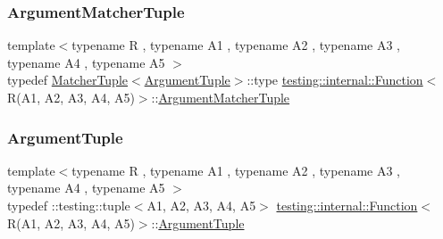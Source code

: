 \mbox{\label{structtesting_1_1internal_1_1Function_3_01R_07A1_00_01A2_00_01A3_00_01A4_00_01A5_08_4_a03c18380538e53141227afe6d0f20cc8}} 
\subsubsection{\texorpdfstring{ArgumentMatcherTuple}{ArgumentMatcherTuple}}
{\footnotesize\ttfamily template$<$typename R , typename A1 , typename A2 , typename A3 , typename A4 , typename A5 $>$ \\
typedef \mbox{\hyperlink{structtesting_1_1internal_1_1MatcherTuple}{Matcher\+Tuple}}$<$\mbox{\hyperlink{structtesting_1_1internal_1_1Function_3_01R_07_08_4_ad483c3128c470d8cdb55c3ac1c575c11}{Argument\+Tuple}}$>$\+::type \mbox{\hyperlink{structtesting_1_1internal_1_1Function}{testing\+::internal\+::\+Function}}$<$ R(A1, A2, A3, A4, A5)$>$\+::\mbox{\hyperlink{structtesting_1_1internal_1_1Function_3_01R_07_08_4_a9bec5cf8937e8af99dedab2f40129fab}{Argument\+Matcher\+Tuple}}}

\mbox{\label{structtesting_1_1internal_1_1Function_3_01R_07A1_00_01A2_00_01A3_00_01A4_00_01A5_08_4_af5a1487829347eae2a48b2f66f216f52}} 
\subsubsection{\texorpdfstring{ArgumentTuple}{ArgumentTuple}}
{\footnotesize\ttfamily template$<$typename R , typename A1 , typename A2 , typename A3 , typename A4 , typename A5 $>$ \\
typedef \+::testing\+::tuple$<$A1, A2, A3, A4, A5$>$ \mbox{\hyperlink{structtesting_1_1internal_1_1Function}{testing\+::internal\+::\+Function}}$<$ R(A1, A2, A3, A4, A5)$>$\+::\mbox{\hyperlink{structtesting_1_1internal_1_1Function_3_01R_07_08_4_ad483c3128c470d8cdb55c3ac1c575c11}{Argument\+Tuple}}}

